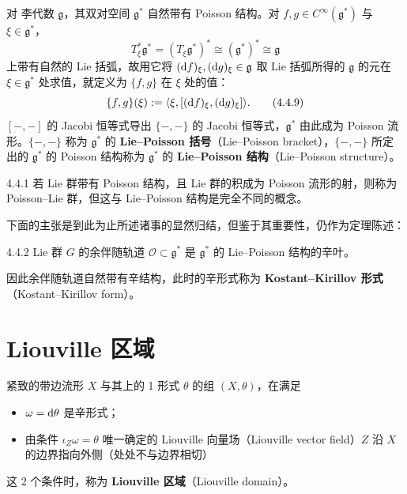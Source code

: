 对 李代数 $\mathfrak{g}$，其双对空间 $\mathfrak{g}^*$ 自然带有 Poisson 结构。对 $f,g\in C^\infty(\mathfrak{g}^*)$ 与 $\xi\in\mathfrak{g}^*$，
\begin{equation}
  T^*_\xi\mathfrak{g}^* = (T_\xi\mathfrak{g}^*)^*\cong(\mathfrak{g}^*)^*\cong\mathfrak{g}
  \tag{4.4.8}
\end{equation}
上带有自然的 Lie 括弧，故用它将 $(\mathrm{d} f)_\xi,(\mathrm{d} g)_\xi\in\mathfrak{g}$ 取 Lie 括弧所得的 $\mathfrak{g}$ 的元在 $\xi\in\mathfrak{g}^*$ 处求值，就定义为 $\{f,g\}$ 在 $\xi$ 处的值：
\begin{equation}
  \{f,g\}(\xi) := \langle\xi,[(\mathrm{d} f)_\xi,(\mathrm{d} g)_\xi]\rangle.
  \tag{4.4.9}
\end{equation}
$[-,-]$ 的 Jacobi 恒等式导出 $\{-,-\}$ 的 Jacobi 恒等式，$\mathfrak{g}^*$ 由此成为 Poisson 流形。$\{-,-\}$ 称为 $\mathfrak{g}^*$ 的 \textbf{Lie--Poisson 括号}（Lie--Poisson bracket），$\{-,-\}$ 所定出的 $\mathfrak{g}^*$ 的 Poisson 结构称为 $\mathfrak{g}^*$ 的 \textbf{Lie--Poisson 结构}（Lie--Poisson structure）。

\begin{remark}{4.4.1}
若 Lie 群带有 Poisson 结构，且 Lie 群的积成为 Poisson 流形的射，则称为 Poisson--Lie 群，但这与 Lie--Poisson 结构是完全不同的概念。
\end{remark}

下面的主张是到此为止所述诸事的显然归结，但鉴于其重要性，仍作为定理陈述：

\begin{theorem}{4.4.2}
Lie 群 $G$ 的余伴随轨道 $\mathcal{O}\subset\mathfrak{g}^*$ 是 $\mathfrak{g}^*$ 的 Lie--Poisson 结构的辛叶。
\end{theorem}

因此余伴随轨道自然带有辛结构，此时的辛形式称为 \textbf{Kostant--Kirillov 形式}（Kostant--Kirillov form）。



\section{Liouville 区域}

紧致的带边流形 $X$ 与其上的 1 形式 $\theta$ 的组 $(X,\theta)$，在满足
\begin{itemize}[leftmargin=2em]
  \item $\omega = \mathrm{d}\theta$ 是辛形式；
  \item 由条件 $\iota_Z\omega = \theta$ 唯一确定的 Liouville 向量场（Liouville vector field）$Z$ 沿 $X$ 的边界指向外侧（处处不与边界相切）
\end{itemize}
这 2 个条件时，称为 \textbf{Liouville 区域}（Liouville domain）。

